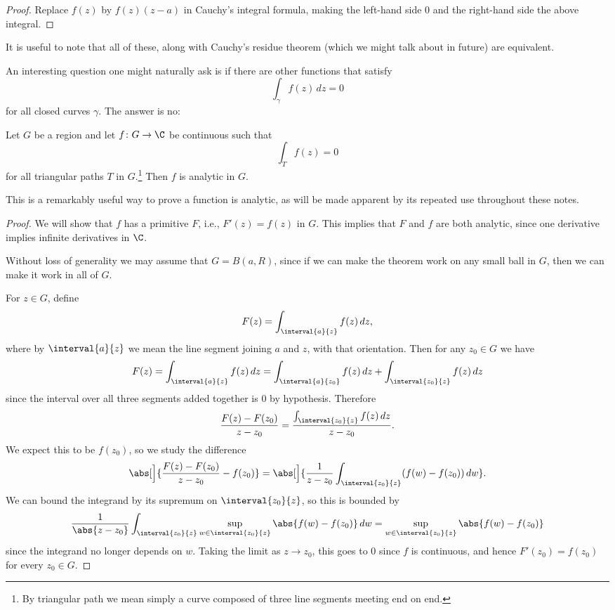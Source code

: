 \begin{proof}
	Replace $f(z)$ by $f(z) (z - a)$ in Cauchy's integral formula, making the left-hand side $0$ and the right-hand side the above integral.
\end{proof}

It is useful to note that all of these, along with Cauchy's residue theorem (which we might talk about in future) are equivalent.

An interesting question one might naturally ask is if there are other functions that satisfy
\[
	\int_\gamma f(z) \, d z = 0
\]
for all closed curves $\gamma$.
The answer is no:

\begin{theorem}\label{thm4.5}
	Let $G$ be a region and let $f \colon G \to \C$ be continuous such that
	\[
		\int_T f(z) = 0
	\]
	for all triangular paths $T$ in $G$.\footnote{By triangular path we mean simply a curve composed of three line segments meeting end on end.}
	Then $f$ is analytic in $G$.
\end{theorem}

\begin{remark}
	This is a remarkably useful way to prove a function is analytic, as will be made apparent by its repeated use throughout these notes. 
\end{remark}

\begin{proof}
	We will show that $f$ has a primitive $F$, i.e., $F'(z) = f(z)$ in $G$.
	This implies that $F$ and $f$ are both analytic, since one derivative implies infinite derivatives in $\C$.

	Without loss of generality we may assume that $G = B(a, R)$, since if we can make the theorem work on any small ball in $G$, then we can make it work in all of $G$.

	For $z \in G$, define
	\[
		F(z) = \int_{\interval{a}{z}} f(z) \, d z,
	\]
	where by $\interval{a}{z}$ we mean the line segment joining $a$ and $z$, with that orientation.
	Then for any $z_0 \in G$ we have
	\[
		F(z) = \int_{\interval{a}{z}} f(z) \, d z = \int_{\interval{a}{z_0}} f(z) \, d z + \int_{\interval{z_0}{z}} f(z) \, d z
	\]
	since the interval over all three segments added together is $0$ by hypothesis.
	Therefore
	\[
		\frac{F(z) - F(z_0)}{z - z_0} = \frac{\int_{\interval{z_0}{z}} f(z) \, d z}{z - z_0}.
	\]
	We expect this to be $f(z_0)$, so we study the difference
	\[
		\abs[\Big]{\frac{F(z) - F(z_0)}{z - z_0} - f(z_0)} = \abs[\Big]{ \frac{1}{z - z_0} \int_{\interval{z_0}{z}} (f(w) - f(z_0)) \, d w}.
	\]
	We can bound the integrand by its supremum on $\interval{z_0}{z}$, so this is bounded by
	\[
		\frac{1}{\abs{z - z_0}} \int_{\interval{z_0}{z}} \sup_{w \in \interval{z_0}{z}} \abs{f(w) - f(z_0)} \, d w = \sup_{w \in \interval{z_0}{z}} \abs{f(w) - f(z_0)}
	\]
	since the integrand no longer depends on $w$.
	Taking the limit as $z \to z_0$, this goes to $0$ since $f$ is continuous, and hence $F'(z_0) = f(z_0)$ for every $z_0 \in G$.
\end{proof}


